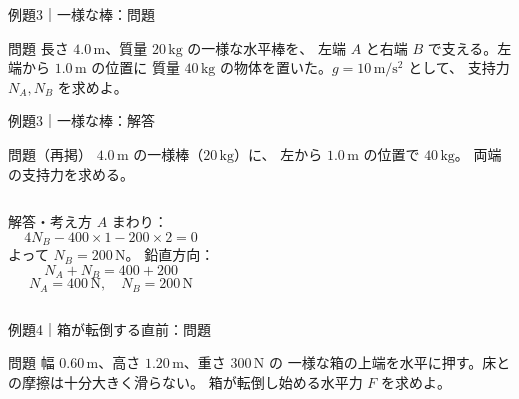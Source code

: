 \documentclass[notheorems,aspectratio=169]{beamer}
\newcommand{\qcard}[1]{%
  \begin{block}{問題}\centering\large #1\end{block}}
\newcommand{\qsmall}[1]{%
  \begin{block}{問題（再掲）}\small #1\end{block}}
\newcommand{\acard}[1]{%
  \begin{exampleblock}{解答・考え方}#1\end{exampleblock}}
\begin{document}
\begin{frame}{例題3｜一様な棒：問題}
  \vfill
  \qcard{
    長さ $4.0\,\mathrm m$、質量 $20\,\mathrm{kg}$ の一様な水平棒を、
    左端 $A$ と右端 $B$ で支える。左端から $1.0\,\mathrm m$ の位置に
    質量 $40\,\mathrm{kg}$ の物体を置いた。$g=10\,\mathrm{m/s^2}$ として、
    支持力 $N_A,N_B$ を求めよ。
  }
  \vfill
\end{frame}

\begin{frame}{例題3｜一様な棒：解答}
  \qsmall{
    $4.0\,\mathrm m$ の一様棒（$20\,\mathrm{kg}$）に、
    左から $1.0\,\mathrm m$ の位置で $40\,\mathrm{kg}$。
    両端の支持力を求める。
  }
  \begin{columns}[T,onlytextwidth]
    \centering
    \acard{
      $A$ まわり：
      \[
        4N_B-400\times1-200\times2=0
      \]
      よって $N_B=200\,\mathrm N$。
      鉛直方向：
      \[
        N_A+N_B=400+200
      \]
      \[
        \boxed{N_A=400\,\mathrm N,\quad N_B=200\,\mathrm N}
      \]
    }
  \end{columns}
\end{frame}

\begin{frame}{例題4｜箱が転倒する直前：問題}
  \vfill
  \qcard{
    幅 $0.60\,\mathrm m$、高さ $1.20\,\mathrm m$、重さ $300\,\mathrm N$ の
    一様な箱の上端を水平に押す。床との摩擦は十分大きく滑らない。
    箱が転倒し始める水平力 $F$ を求めよ。
  }
  \vfill
\end{frame}
\end{document}
